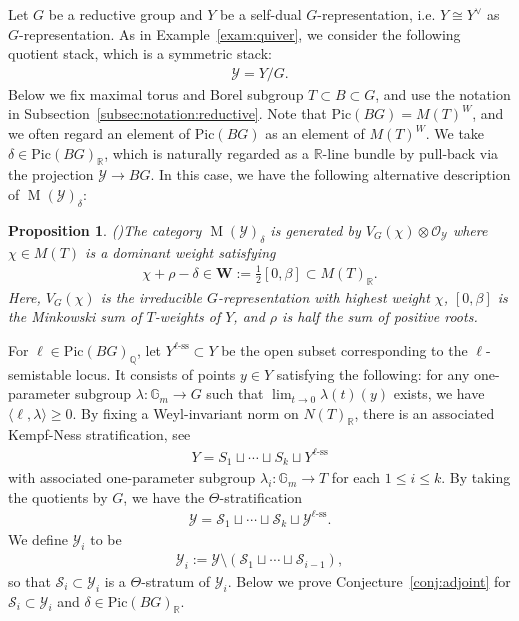 \documentclass [11pt,oneside,a4paper,mathscr]{amsart}
\newtheorem{prop}[thm]{Proposition}
\theoremstyle{definition}
\renewcommand{\leq}{\leqslant}
\renewcommand{\geq}{\geqslant}
\newcommand{\Y}{\mathcal{Y}}
\newcommand{\MM}{\operatorname{M}}
\begin{document}
Let $G$ be a reductive group and $Y$ be a self-dual $G$-representation, i.e. 
$Y \cong Y^{\vee}$ as $G$-representation. 
As in Example~\ref{exam:quiver}, we 
consider the following quotient stack, which is a symmetric stack:
\begin{align*}
\mathcal{Y}=Y/G.
\end{align*}
Below
we fix maximal torus and Borel subgroup $T\subset B\subset G$, and use the 
notation in Subsection~\ref{subsec:notation:reductive}.
 Note that $\mathrm{Pic}(BG)=M(T)^W$, and we often regard an 
 element of $\mathrm{Pic}(BG)$ as an element of $M(T)^W$. 
 We take 
$\delta \in \mathrm{Pic}(BG)_{\mathbb{R}}$, which is naturally 
regarded as a $\mathbb{R}$-line bundle by pull-back via the projection 
$\mathcal{Y} \to BG$. 
In this case, 
 we have the following alternative description of $\MM(\mathcal{Y})_{\delta}$:
\begin{prop}\emph{(\cite[Corollary~3.35]{PTquiver})}\label{prop:QB:weight}
The category $\MM(\mathcal{Y})_{\delta}$ is generated by $V_G(\chi) \otimes \mathcal{O}_{\mathcal{Y}}$ 
where $\chi \in M(T)$ is a dominant weight satisfying 
\begin{align}\label{poly:W}
\chi+\rho-\delta \in \mathbf{W}:=\frac{1}{2}[0, \beta] \subset M(T)_{\mathbb{R}}.
\end{align}
Here, $V_G(\chi)$ is the irreducible $G$-representation 
with highest weight $\chi$, $[0, \beta]$ is the Minkowski sum of $T$-weights of $Y$,
and $\rho$ is half the sum of positive roots. 
\end{prop}



For $\ell \in \mathrm{Pic}(BG)_{\mathbb{Q}}$, let $Y^{\ell\text{-ss}} \subset Y$ 
be the open subset corresponding to the $\ell$-semistable locus. 
It consists of points $y\in Y$ satisfying the following: 
for any 
one-parameter subgroup $\lambda \colon \mathbb{G}_m \to G$
such that $\lim_{t\to 0}\lambda(t)(y)$ exists, we have 
$\langle \ell, \lambda \rangle \geq 0$. 
By fixing a Weyl-invariant norm on 
$N(T)_{\mathbb{R}}$, there is an associated 
Kempf-Ness stratification, see~\cite[Section~2.1]{halp}
\begin{align*}
    Y=S_1 \sqcup \cdots \sqcup S_k \sqcup Y^{\ell\text{-ss}}
\end{align*}
with associated one-parameter subgroup $\lambda_i \colon \mathbb{G}_m \to T$
for each $1\leq i \leq k$. 
By taking the quotients by $G$, we have the $\Theta$-stratification~\cite{halpinstab}
\begin{align*}
    \mathcal{Y}=\mathcal{S}_1 \sqcup \cdots \sqcup \mathcal{S}_k \sqcup \mathcal{Y}^{\ell\text{-ss}}. 
\end{align*}
We define $\Y_i$ to be 
\begin{align*}
    \mathcal{Y}_i :=\mathcal{Y} \setminus (\mathcal{S}_1 \sqcup \cdots \sqcup \mathcal{S}_{i-1}), 
\end{align*}
so that $\mathcal{S}_i \subset \mathcal{Y}_i$ is a $\Theta$-stratum of $\mathcal{Y}_i$. 
Below we prove Conjecture~\ref{conj:adjoint} for $\mathcal{S}_i \subset \mathcal{Y}_i$
and $\delta \in \mathrm{Pic}(BG)_{\mathbb{R}}$. 
\end{document}

